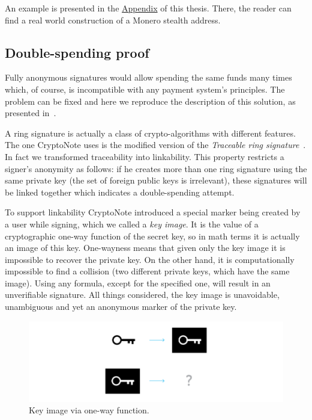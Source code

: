 An example is presented in the \hyperref[sec:construction]{Appendix} of this thesis. There, the reader can find a real world construction of a Monero stealth address.%



\subsection{Double-spending proof}
Fully anonymous signatures would allow spending the same funds many times which, of course, is incompatible with any payment system's principles. The problem can be fixed and here we reproduce the description of this solution, as presented in~\cite{cryptonote}.

A ring signature is actually a class of crypto-algorithms with different features. The one CryptoNote uses is the modified version of the \emph{Traceable ring signature}~\cite{traceable2}. In fact we transformed traceability into linkability. This property restricts a signer's anonymity as follows: if he creates more than one ring signature using the same private key (the set of foreign public keys is irrelevant), these signatures will be linked together which indicates a double-spending attempt.

To support linkability CryptoNote introduced a special marker being created by a user while signing, which we called a \emph{key image}. It is the value of a cryptographic one-way function of the secret key, so in math terms it is actually an image of this key. One-wayness means that given only the key image it is impossible to recover the private key. On the other hand, it is computationally impossible to find a collision (two different private keys, which have the same image). Using any formula, except for the specified one, will result in an unverifiable signature. All things considered, the key image is unavoidable, unambiguous and yet an anonymous marker of the private key.

\begin{figure}[H]
  \centering
  \includegraphics[width=0.9 \columnwidth,keepaspectratio]{Images/CryptoNote/key_image.png}
  \caption{Key image via one-way function.~\cite{cryptonote}}
  \label{fig:key_image}
\end{figure}

